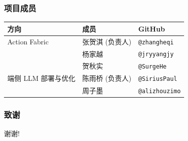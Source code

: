 \documentclass[aspectratio=169]{ctexbeamer}
\newcommand{\code}[1]{\texttt{#1}}
\begin{document}
\begin{frame}
  \frametitle{项目成员}
  \scriptsize
  \begin{tabularx}{\textwidth}{p{}p{}Y}
    \toprule
    方向 & 成员 & GitHub \\
    \midrule
    Action Fabric & 张贺淇 (负责人) & \code{@zhangheqi} \\
    & 杨家越 & \code{@jryyangjy} \\
    & 贺秋实 & \code{@SurgeHe} \\
    端侧 LLM 部署与优化 & 陈雨桥 (负责人) & \code{@SiriusPaul} \\
    & 周子墨 & \code{@alizhouzimo} \\
    \bottomrule
  \end{tabularx}
\end{frame}

\begin{frame}
  \frametitle{致谢}
  \centerline{\Large 谢谢!}
\end{frame}
\end{document}
